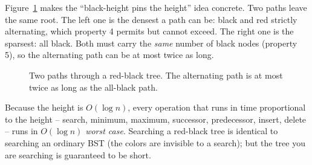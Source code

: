Figure~\ref{fig:black-height-paths} makes the ``black-height pins the height'' idea concrete. Two
paths leave the same root. The left one is the densest a path can be: black and
red strictly alternating, which property 4 permits but cannot exceed. The right
one is the sparsest: all black. Both must carry the \emph{same} number of black
nodes (property 5), so the alternating path can be at most twice as long.

\begin{figure}[htbp]
\centering
{}
\caption{Two paths through a red-black tree. The alternating path is at most twice as long as the all-black path.}
\label{fig:black-height-paths}
\end{figure}

\begin{focusbox}
Because the height is $O(\log n)$, every operation that runs in
time proportional to the height -- search, minimum, maximum, successor,
predecessor, insert, delete -- runs in $O(\log n)$ \emph{worst case}. Searching a
red-black tree is identical to searching an ordinary BST (the colors are
invisible to a search); but the tree you are searching is
guaranteed to be short.
\end{focusbox}

